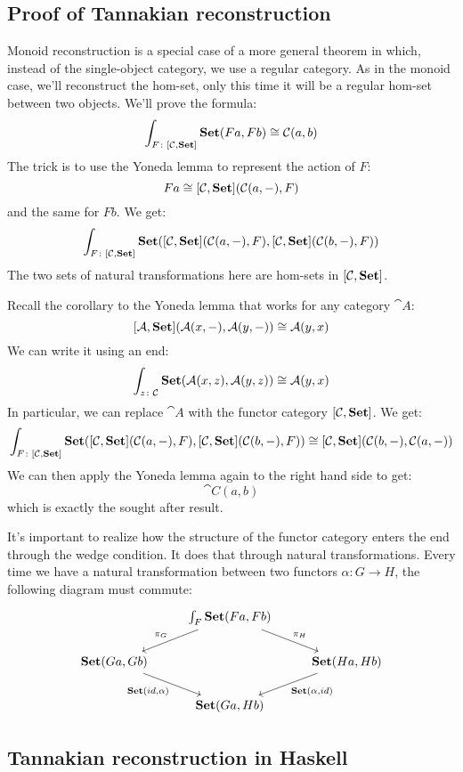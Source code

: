 \documentclass[DaoFP]{subfiles}
\begin{document}
\subsection{Proof of Tannakian reconstruction}

Monoid reconstruction is a special case of a more general theorem in which, instead of the single-object category, we use a regular category. As in the monoid case, we'll reconstruct the hom-set, only this time it will be a regular hom-set between two objects. We'll prove the formula:
\[ \int_{F \colon [\mathcal{C}, \mathbf{Set}]} \mathbf{Set} (F a, F b) \cong \mathcal{C}(a, b) \]
The trick is to use the Yoneda lemma to represent the action of $F$:
\[ F a \cong [\mathcal{C}, \mathbf{Set}] ( \mathcal{C} (a ,-), F) \]
and the same for $F b$. We get:
\[ \int_{F \colon [\mathcal{C}, \mathbf{Set}]} \mathbf{Set} ([\mathcal{C}, \mathbf{Set}] ( \mathcal{C} (a ,-), F), [\mathcal{C}, \mathbf{Set}] ( \mathcal{C} (b ,-), F)) \]
The two sets of natural transformations here are hom-sets in $[\mathcal{C}, \mathbf{Set}]$. 

Recall the corollary to the Yoneda lemma that works for any category $\cat A$:
\[ [\mathcal{A}, \mathbf{Set}] (\mathcal{A} (x, -), \mathcal{A} (y, -)) \cong \mathcal{A} (y, x) \]
We can write it using an end:
\[ \int_{z \colon \mathcal{C}} \mathbf{Set} (\mathcal{A} (x, z), \mathcal{A} (y, z)) \cong \mathcal{A} (y, x) \]
In particular, we can replace $\cat A$ with the functor category $[\mathcal{C}, \mathbf{Set}]$. We get:
\[ \int_{F \colon [\mathcal{C}, \mathbf{Set}]} \mathbf{Set} ([\mathcal{C}, \mathbf{Set}] ( \mathcal{C} (a ,-), F), [\mathcal{C}, \mathbf{Set}] ( \mathcal{C} (b ,-), F)) \cong [\mathcal{C}, \mathbf{Set}](\mathcal{C} (b ,-), \mathcal{C} (a ,-))\]
We can then apply the Yoneda lemma again to the right hand side to get:
\[ \cat C (a, b) \]
which is exactly the sought after result.

It's important to realize how the structure of the functor category enters the end through the wedge condition. It does that through natural transformations. Every time we have a natural transformation between two functors $\alpha \colon G \to H$, the following diagram must commute:
\[
 \begin{tikzcd}
 & \int_F \Set (F a, F b)
 \arrow[dl, "\pi_G"']
 \arrow[dr, "\pi_H"]
 \\
 \Set(G a, G b)
 \arrow[dr, "{\Set(id, \alpha)}"']
 && \Set (H a, H b)
  \arrow[dl, "{\Set (\alpha, id)}"]
\\
 & \Set (G a, H b)
 \end{tikzcd}
\]

\subsection{Tannakian reconstruction in Haskell}
\end{document}

